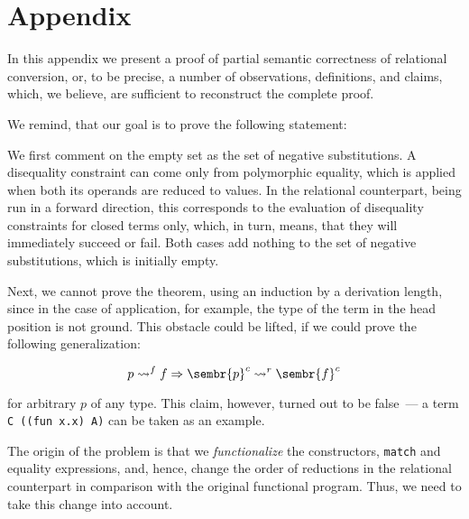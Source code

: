 \section{Appendix}
\label{appendix}

In this appendix we present a proof of partial semantic correctness of relational conversion, or, to be precise, 
a number of observations, definitions, and claims, which, we believe, are sufficient to reconstruct
the complete proof. 

We remind, that our goal is to prove the following statement:

  
We first comment on the empty set as the set of negative substitutions. A disequality constraint can
come only from polymorphic equality, which is applied when both its operands are reduced to
values. In the relational counterpart, being run in a forward direction, this corresponds to the evaluation of disequality constraints for
closed terms only, which, in turn, means, that they will immediately succeed or fail. Both cases
add nothing to the set of negative substitutions, which is initially empty. 

Next, we cannot prove the theorem, using an induction by a derivation length, since in the case of
application, for example, the type of the term in the head position is not ground. This 
obstacle could be lifted, if we could prove the following generalization:

$$
p\leadsto^f f \Rightarrow \sembr{p}^c\leadsto^r\sembr{f}^c
$$ 

\noindent for arbitrary $p$ of any type. This claim, however, turned out to be false~--- a term
\lstinline|C ((fun x.x) A)| can be taken as an example.  

The origin of the problem is that we \emph{functionalize} the constructors, \lstinline|match| and
equality expressions, and, hence, change the order of reductions in the relational counterpart in 
comparison with the original functional program. Thus, we need to take this change into account.

